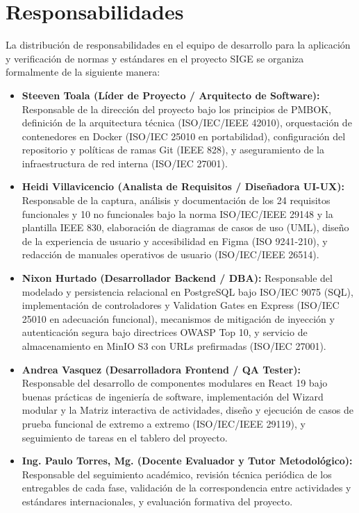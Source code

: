 \documentclass[12pt,a4paper]{article}
\begin{document}
\section{Responsabilidades}

La distribución de responsabilidades en el equipo de desarrollo para la aplicación y verificación de normas y estándares en el proyecto SIGE se organiza formalmente de la siguiente manera:

\begin{itemize}[leftmargin=1.5em, itemsep=2pt]
    \item \textbf{Steeven Toala (Líder de Proyecto / Arquitecto de Software):}
    Responsable de la dirección del proyecto bajo los principios de PMBOK, definición de la arquitectura técnica (ISO/IEC/IEEE 42010), orquestación de contenedores en Docker (ISO/IEC 25010 en portabilidad), configuración del repositorio y políticas de ramas Git (IEEE 828), y aseguramiento de la infraestructura de red interna (ISO/IEC 27001).
    \item \textbf{Heidi Villavicencio (Analista de Requisitos / Diseñadora UI-UX):}
    Responsable de la captura, análisis y documentación de los 24 requisitos funcionales y 10 no funcionales bajo la norma ISO/IEC/IEEE 29148 y la plantilla IEEE 830, elaboración de diagramas de casos de uso (UML), diseño de la experiencia de usuario y accesibilidad en Figma (ISO 9241-210), y redacción de manuales operativos de usuario (ISO/IEC/IEEE 26514).
    \item \textbf{Nixon Hurtado (Desarrollador Backend / DBA):}
    Responsable del modelado y persistencia relacional en PostgreSQL bajo ISO/IEC 9075 (SQL), implementación de controladores y Validation Gates en Express (ISO/IEC 25010 en adecuación funcional), mecanismos de mitigación de inyección y autenticación segura bajo directrices OWASP Top 10, y servicio de almacenamiento en MinIO S3 con URLs prefirmadas (ISO/IEC 27001).
    \item \textbf{Andrea Vasquez (Desarrolladora Frontend / QA Tester):}
    Responsable del desarrollo de componentes modulares en React 19 bajo buenas prácticas de ingeniería de software, implementación del Wizard modular y la Matriz interactiva de actividades, diseño y ejecución de casos de prueba funcional de extremo a extremo (ISO/IEC/IEEE 29119), y seguimiento de tareas en el tablero del proyecto.
    \item \textbf{Ing. Paulo Torres, Mg. (Docente Evaluador y Tutor Metodológico):}
    Responsable del seguimiento académico, revisión técnica periódica de los entregables de cada fase, validación de la correspondencia entre actividades y estándares internacionales, y evaluación formativa del proyecto.
\end{itemize}
\end{document}

